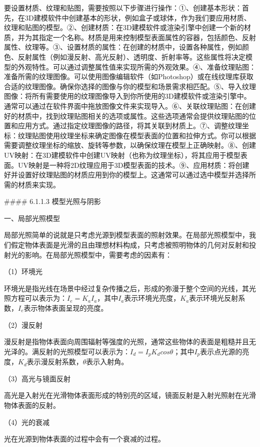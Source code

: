 要设置材质、纹理和贴图，需要按照以下步骤进行操作：①、创建基本形状：首先，在3D建模软件中创建基本的形状，例如盒子或球体，作为我们要应用材质、纹理和贴图的模型。②、创建材质：在3D建模软件或渲染引擎中创建一个新的材质，并为其指定一个名称。材质是用来控制模型表面属性的容器，包括颜色、反射属性、纹理等。③、设置材质的属性：在创建的材质中，设置各种属性，例如颜色、反射属性（例如漫反射、高光反射）、透明度、折射率等。这些属性将决定模型的外观特性。可以通过调整属性值来实现所需的外观效果。④、准备纹理贴图：准备所需的纹理图像。可以使用图像编辑软件（如Photoshop）或在线纹理库获取合适的纹理图像。确保你选择的图像与你的模型和场景需求相匹配。⑤、导入纹理图像：将所有需要使用的纹理图像导入到你所使用的3D建模软件或渲染引擎中。通常可以通过在软件界面中拖放图像文件来实现导入。⑥、关联纹理贴图：在创建好的材质中，找到纹理贴图相关的选项或属性。这些选项通常会提供纹理贴图的位置和应用方式。通过指定纹理图像的路径，将其关联到材质上。⑦、调整纹理坐标：纹理贴图使用纹理坐标来确定图像在模型表面的位置和拉伸方式。你可以根据需要调整纹理坐标的缩放、旋转等参数，以确保纹理在模型上正确映射。⑧、创建UV映射：在3D建模软件中创建UV映射（也称为纹理坐标），将其应用于模型表面。UV映射是一种将2D纹理应用于3D模型表面的技术。⑨、应用材质：将创建好并设置好纹理贴图的材质应用到你的模型上。这通常可以通过选中模型并选择所需的材质来实现。

\#\#\#\# 6.1.1.3 模型光照与阴影

一、局部光照模型

局部光照简单的说就是只考虑光源到模型表面的照射效果。在局部光照模型中，我们假定物体表面是光滑的且由理想材料构成，只考虑被照明物体的几何对反射和投射光的影响。在局部光照模型中，需要考虑的因素有：

（1）环境光

环境光是指光线在场景中经过复杂传播之后，形成的弥漫于整个空间的光线，其光照方程可以表示为：\(I_e=K_aI_a\)，其中\(I_a\)表示环境光亮度，\(K_a\)表示环境光反射系数，\(I_e\)表示物体表面呈现的亮度。

（2）漫反射

漫反射是指物体表面向周围辐射等强度的光照，通常这些物体的表面是粗糙并且无光泽的。满反射的光照模型可以表示为：\(I_d=I_pK_d cos \theta\)；其中\(I_p\)表示点光源的亮度，\(K_d\)表示漫反射系数，\(\theta\)表示入射角。

（3）高光与镜面反射

高光是入射光在光滑物体表面形成的特别亮的区域，镜面反射是入射光照射在光滑物体表面的反射。

（4）光的衰减

光在光源到物体表面的过程中会有一个衰减的过程。

